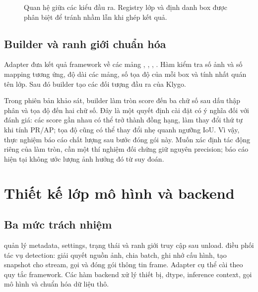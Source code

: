 \begin{figure}[H]\centering
{}
\caption{Quan hệ giữa các kiểu đầu ra. Registry lớp và định danh box được phân biệt để tránh nhầm lẫn khi ghép kết quả.}
\end{figure}

\subsection{Builder và ranh giới chuẩn hóa}
Adapter đưa kết quả framework về các mảng , , , . Hàm  kiểm tra số ảnh và số mapping tương ứng, độ dài các mảng, số tọa độ của mỗi box và tính nhất quán tên lớp. Sau đó builder tạo các đối tượng đầu ra của Klygo.

Trong phiên bản khảo sát, builder làm tròn score đến ba chữ số sau dấu thập phân và tọa độ đến hai chữ số. Đây là một quyết định cài đặt có ý nghĩa đối với đánh giá: các score gần nhau có thể trở thành đồng hạng, làm thay đổi thứ tự khi tính PR/AP; tọa độ cũng có thể thay đổi nhẹ quanh ngưỡng IoU. Vì vậy, thực nghiệm báo cáo chất lượng sau bước đóng gói này. Muốn xác định tác động riêng của làm tròn, cần một thí nghiệm đối chứng giữ nguyên precision; báo cáo hiện tại không ước lượng ảnh hưởng đó từ suy đoán.

\section{Thiết kế lớp mô hình và backend}
\subsection{Ba mức trách nhiệm}
 quản lý metadata, settings, trạng thái và ranh giới truy cập sau unload.  điều phối tác vụ detection: giải quyết nguồn ảnh, chia batch, ghi nhớ cấu hình, tạo snapshot cho stream, gọi  và đóng gói thông tin frame. Adapter cụ thể cài  theo quy tắc framework. Các hàm backend xử lý thiết bị, dtype, inference context, gọi mô hình và chuẩn hóa dữ liệu thô.

